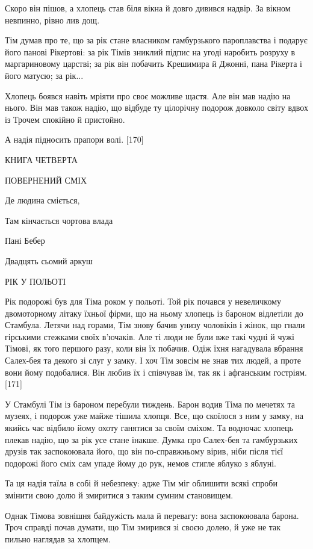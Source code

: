 Скоро він пішов, а хлопець став біля вікна й довго дивився надвір. За вікном невпинно, рівно лив дощ.

Тім думав про те, що за рік стане власником гамбурзького пароплавства і подарує його панові Рікертові: за рік Тімів зниклий підпис на угоді наробить розруху в маргариновому царстві; за рік він побачить Крешимира й Джонні, пана Рікерта і його матусю; за рік...

Хлопець боявся навіть мріяти про своє можливе щастя. Але він мав надію на нього. Він мав також надію, що відбуде ту цілорічну подорож довколо світу вдвох із Трочем спокійно й пристойно.

А надія підносить прапори волі. [170]

КНИГА ЧЕТВЕРТА

ПОВЕРНЕНИЙ СМІХ

Де людина сміється,

Там кінчається чортова влада

Пані Бебер

Двадцять сьомий аркуш

РІК У ПОЛЬОТІ

Рік подорожі був для Тіма роком у польоті. Той рік почався у невеличкому двомоторному літаку їхньої фірми, що на ньому хлопець із бароном відлетіли до Стамбула. Летячи над горами, Тім знову бачив унизу чоловіків і жінок, що гнали гірськими стежками своїх в'ючаків. Але ті люди не були вже такі чудні й чужі Тімові, як того першого разу, коли він їх побачив. Одіж їхня нагадувала вбрання Салех-бея та декого зі слуг у замку. І хоч Тім зовсім не знав тих людей, а проте вони йому подобалися. Він любив їх і співчував їм, так як і афганським гостріям. [171]

У Стамбулі Тім із бароном перебули тиждень. Барон водив Тіма по мечетях та музеях, і подорож уже майже тішила хлопця. Все, що скоїлося з ним у замку, на якийсь час відбило йому охоту ганятися за своїм сміхом. Та водночас хлопець плекав надію, що за рік усе стане інакше. Думка про Салех-бея та гамбурзьких друзів так заспокоювала його, що він по-справжньому вірив, ніби після тієї подорожі його сміх сам упаде йому до рук, немов стигле яблуко з яблуні.

Та ця надія таїла в собі й небезпеку: адже Тім міг облишити всякі спроби змінити свою долю й змиритися з таким сумним становищем.

Однак Тімова зовнішня байдужість мала й перевагу: вона заспокоювала барона. Троч справді почав думати, що Тім змирився зі своєю долею, й уже не так пильно наглядав за хлопцем.

